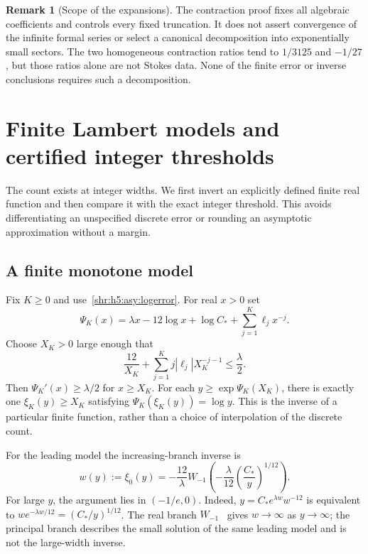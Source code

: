 \documentclass[11pt,letterpaper]{article}
\numberwithin{equation}{section}
\theoremstyle{definition}
\newtheorem{remark}[theorem]{Remark}
\newcommand{\1}{\mathbf 1}
\begin{document}
\begin{remark}[Scope of the expansions]
The contraction proof fixes all algebraic coefficients and controls every
fixed truncation. It does not assert convergence of the infinite formal
series or select a canonical decomposition into exponentially small
sectors. The two homogeneous contraction ratios tend to $1/3125$ and
$-1/27$, but those ratios alone are not Stokes data. None of the finite
error or inverse conclusions requires such a decomposition.
\end{remark}

\section{Finite Lambert models and certified integer thresholds}
\label{shr:h5:inv:section}
The count exists at integer widths. We first invert an explicitly defined
finite real function and then compare it with the exact integer threshold.
This avoids differentiating an unspecified discrete error or rounding an
asymptotic approximation without a margin.

\subsection{A finite monotone model}
Fix $K\ge0$ and use~\eqref{shr:h5:asy:logerror}. For real $x>0$ set
\begin{equation}
 \Psi_K(x)=\lambda x-12\log x+\log C_*
                      +\sum_{j=1}^K\ell_jx^{-j}.
 \label{shr:h5:inv:model}
\end{equation}
Choose $X_K>0$ large enough that
\begin{equation}
 \frac{12}{X_K}+\sum_{j=1}^Kj|\ell_j|X_K^{-j-1}
 \le\frac\lambda2.
 \label{shr:h5:inv:derivative}
\end{equation}
Then $\Psi_K'(x)\ge\lambda/2$ for $x\ge X_K$.
For each $y\ge\exp\Psi_K(X_K)$, there is exactly one
$\xi_K(y)\ge X_K$ satisfying $\Psi_K(\xi_K(y))=\log y$.
This is the inverse of a particular finite function, rather than a choice
of interpolation of the discrete count.

For the leading model the increasing-branch inverse is
\begin{equation}
 w(y):=\xi_0(y)
 =-\frac{12}{\lambda}
 W_{-1}\left(-\frac{\lambda}{12}
                     \left(\frac{C_*}{y}\right)^{1/12}\right).
 \label{shr:h5:inv:Lambert}
\end{equation}
For large $y$, the argument lies in $(-1/e,0)$. Indeed,
$y=C_*e^{\lambda w}w^{-12}$ is equivalent to
$w e^{-\lambda w/12}=(C_*/y)^{1/12}$.
The real branch $W_{-1}$~\cite{DLMFW} gives $w\to\infty$ as $y\to\infty$;
the principal branch describes the small solution of the same leading
model and is not the large-width inverse.
\end{document}

